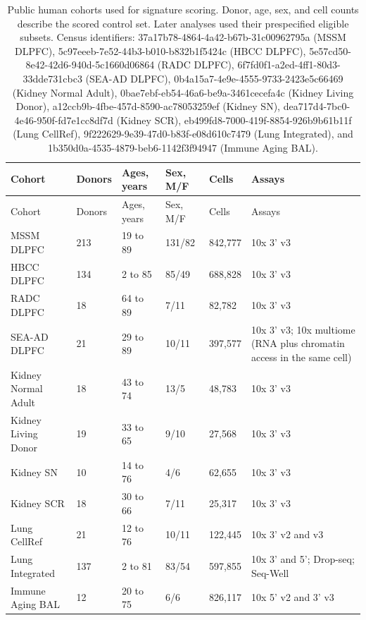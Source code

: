\documentclass[11pt]{article}
\begin{document}
{\scriptsize\setlength{\tabcolsep}{3pt}\begin{longtable}{p{}p{}p{}p{}p{}p{}}
\caption{Public human cohorts used for signature scoring. Donor, age, sex, and cell counts describe the scored control set. Later analyses used their prespecified eligible subsets. Census identifiers: 37a17b78-4864-4a42-b67b-31c00962795a (MSSM DLPFC), 5c97eeeb-7e52-44b3-b010-b832b1f5424c (HBCC DLPFC), 5e57cd50-8e42-42d6-940d-5c1660d06864 (RADC DLPFC), 6f7fd0f1-a2ed-4ff1-80d3-33dde731cbc3 (SEA-AD DLPFC), 0b4a15a7-4e9e-4555-9733-2423e5c66469 (Kidney Normal Adult), 0bae7ebf-eb54-46a6-be9a-3461cecefa4c (Kidney Living Donor), a12ccb9b-4fbe-457d-8590-ac78053259ef (Kidney SN), dea717d4-7bc0-4e46-950f-fd7e1cc8df7d (Kidney SCR), eb499fd8-7000-419f-8854-926b9b61b11f (Lung CellRef), 9f222629-9e39-47d0-b83f-e08d610c7479 (Lung Integrated), and 1b350d0a-4535-4879-beb6-1142f3f94947 (Immune Aging BAL).}\label{tab:human-cohorts}\\
Cohort & Donors & Ages, years & Sex, M/F & Cells & Assays \\ \hline
\endfirsthead
Cohort & Donors & Ages, years & Sex, M/F & Cells & Assays \\ \hline
\endhead
MSSM DLPFC & 213 & 19 to 89 & 131/82 & 842,777 & 10x 3' v3 \\ \hline
HBCC DLPFC & 134 & 2 to 85 & 85/49 & 688,828 & 10x 3' v3 \\ \hline
RADC DLPFC & 18 & 64 to 89 & 7/11 & 82,782 & 10x 3' v3 \\ \hline
SEA-AD DLPFC & 21 & 29 to 89 & 10/11 & 397,577 & 10x 3' v3; 10x multiome (RNA plus chromatin access in the same cell) \\ \hline
Kidney Normal Adult & 18 & 43 to 74 & 13/5 & 48,783 & 10x 3' v3 \\ \hline
Kidney Living Donor & 19 & 33 to 65 & 9/10 & 27,568 & 10x 3' v3 \\ \hline
Kidney SN & 10 & 14 to 76 & 4/6 & 62,655 & 10x 3' v3 \\ \hline
Kidney SCR & 18 & 30 to 66 & 7/11 & 25,317 & 10x 3' v3 \\ \hline
Lung CellRef & 21 & 12 to 76 & 10/11 & 122,445 & 10x 3' v2 and v3 \\ \hline
Lung Integrated & 137 & 2 to 81 & 83/54 & 597,855 & 10x 3' and 5'; Drop-seq; Seq-Well \\ \hline
Immune Aging BAL & 12 & 20 to 75 & 6/6 & 826,117 & 10x 5' v2 and 3' v3 \\ \hline
\end{longtable}}
\end{document}
